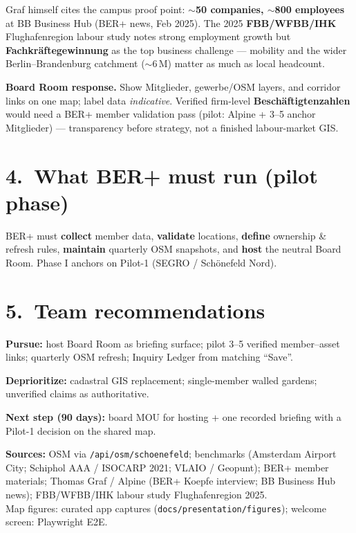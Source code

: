 \documentclass[10pt,a4paper]{article}
\newcommand{\sectionrule}{\vspace{0.25em}{\color{black!20}\hrule height 0.4pt}\vspace{0.45em}}
\begin{document}
Graf himself cites the campus proof point: \textbf{$\sim$50 companies, $\sim$800 employees} at BB Business Hub (BER+ news, Feb 2025). The 2025 \textbf{FBB/WFBB/IHK} Flughafenregion labour study notes strong employment growth but \textbf{Fachkräftegewinnung} as the top business challenge --- mobility and the wider Berlin--Brandenburg catchment ($\sim$6\,M) matter as much as local headcount.

\textbf{Board Room response.} Show Mitglieder, gewerbe/OSM layers, and corridor links on one map; label data \textit{indicative}. Verified firm-level \textbf{Beschäftigtenzahlen} would need a BER+ member validation pass (pilot: Alpine + 3--5 anchor Mitglieder) --- transparency before strategy, not a finished labour-market GIS.

\section*{4.\ What BER+ must run (pilot phase)}
BER+ must \textbf{collect} member data, \textbf{validate} locations, \textbf{define} ownership \& refresh rules, \textbf{maintain} quarterly OSM snapshots, and \textbf{host} the neutral Board Room. Phase I anchors on Pilot-1 (SEGRO / Schönefeld Nord).

\section*{5.\ Team recommendations}
\textbf{Pursue:} host Board Room as briefing surface; pilot 3--5 verified member--asset links; quarterly OSM refresh; Inquiry Ledger from matching ``Save''.

\textbf{Deprioritize:} cadastral GIS replacement; single-member walled gardens; unverified claims as authoritative.

\textbf{Next step (90 days):} board MOU for hosting + one recorded briefing with a Pilot-1 decision on the shared map.

\sectionrule
{\small
\textbf{Sources:} OSM via \texttt{/api/osm/schoenefeld}; benchmarks (Amsterdam Airport City; Schiphol AAA / ISOCARP 2021; VLAIO / Geopunt); BER+ member materials; Thomas Graf / Alpine (BER+ Koepfe interview; BB Business Hub news); FBB/WFBB/IHK labour study Flughafenregion 2025.\\
Map figures: curated app captures (\texttt{docs/presentation/figures}); welcome screen: Playwright E2E.
}
\end{document}
